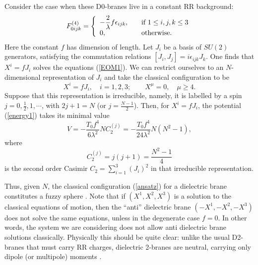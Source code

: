 \documentclass[a4paper,12pt]{article}
\begin{document}
Consider the case when these D0-branes live in a constant RR background:
\begin{equation}
F^{(4)}_{0ijk}=\left\{\begin{array}{ll}\displaystyle{
-\frac{2}{\lambda}f\epsilon_{ijk}},\quad &\hbox{\rm if }1\leq i,j,k\leq 3\\
0, & {\rm otherwise}.
\end{array}
\right.
\label{R-R}
\end{equation}
Here the constant $f$ has dimension of length. Let $J_{i}$ be a basis of $SU(2)$ generators, satisfying the commutation relations
$
[J_{i},J_{j}]=i\epsilon_{ijk}J_{k}
$.
One finds that $X^{i}=fJ_{i}$ solves the equations (\ref{EOM1}).
We can restrict ourselves to an $N$-dimensional representation of $J_{i}$ and take the classical configuration to be
\begin{equation}
X^{i}=f J_{i},\quad i=1,2,3;\quad\quad X^{\mu}=0,\quad\mu\geq 4.
\label{ansatz}
\end{equation}
Suppose that this representation is irreducible, namely, it is labelled by a spin $j=0,\frac{1}{2},1,\cdots$, with
$2j+1=N$ (or $j=\frac{N-1}{2}$). Then, for $X^{i}=fJ_{i}$, the potential (\ref{energy1}) takes its minimal value
\begin{equation}
V=-\frac{T_{0}f^{4}}{6\lambda^{2}}NC^{(j)}_{2}=-\frac{T_{0}f^{4}}{24\lambda^{2}}N(N^{2}-1),
\label{min}
\end{equation}
where
\begin{equation}
C_{2}^{(j)}=j(j+1)=\frac{N^{2}-1}{4}
\label{casimir}
\end{equation}
is the second order Casimir $C_{2}=\sum_{i=1}^{3}(J_{i})^{2}$ in that irreducible representation.

Thus, given $N$, the classical configuration (\ref{ansatz}) for a dielectric 
brane constitutes a fuzzy sphere \cite{Myers}. Note that if $(X^{1},X^{2},X^{3})$ is a solution to the classical equations 
of motion, then the ``anti'' dielectric brane $(-X^{1},-X^{2},-X^{3})$ does 
not solve the same equations, unless in the degenerate 
case $f=0$. In other words, the system we are considering does not allow 
anti dielectric brane solutions classically. Physically this should be quite clear: unlike the usual D2-branes that must carry RR charges, dielectric 2-branes are neutral, carrying only dipole (or multipole) moments \cite{Myers}.
\end{document}
